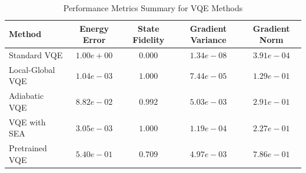 \begin{table}[h!]
\centering
\caption{Performance Metrics Summary for VQE Methods}
\label{tab:performance_metrics}
\begin{tabular}{lcccc}
\hline
\textbf{Method} & \textbf{Energy Error} & \textbf{State Fidelity} & \textbf{Gradient Variance} & \textbf{Gradient Norm} \\
\hline
Standard VQE & $1.00e+00$ & $0.000$ & $1.34e-08$ & $3.91e-04$ \\
Local-Global VQE & $1.04e-03$ & $1.000$ & $7.44e-05$ & $1.29e-01$ \\
Adiabatic VQE & $8.82e-02$ & $0.992$ & $5.03e-03$ & $2.91e-01$ \\
VQE with SEA & $3.05e-03$ & $1.000$ & $1.19e-04$ & $2.27e-01$ \\
Pretrained VQE & $5.40e-01$ & $0.709$ & $4.97e-03$ & $7.86e-01$ \\
\hline
\end{tabular}
\end{table}